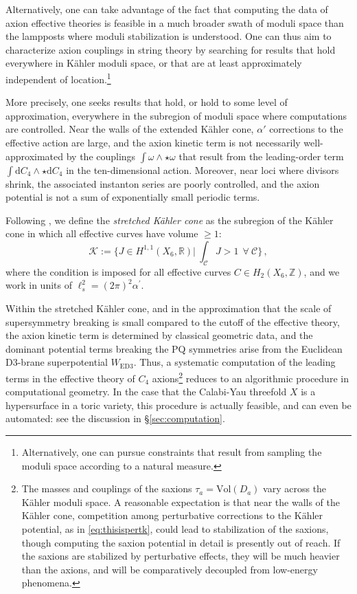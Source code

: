 \documentclass[12pt,a4wide]{article}
\def\d{\mathrm{d}}
\begin{document}
Alternatively, one can take advantage of the fact that computing the data of axion effective theories is feasible in a much broader swath of moduli space than the lampposts where moduli stabilization is understood.  
One can thus aim to characterize axion couplings in string theory by searching for results that hold everywhere in K\"ahler moduli space, or that are at least approximately independent of location.\footnote{Alternatively, one can pursue constraints that result from sampling the moduli space according to a natural measure.}


More precisely, one seeks results that hold, or hold to some level of approximation, everywhere in the subregion of moduli space where computations are controlled.  Near the walls of the extended K\"ahler cone, $\alpha'$ corrections to the effective action are large, and the axion kinetic term is not necessarily well-approximated by the couplings $\int \omega \wedge \star \omega$ that result from the leading-order term $\int \d C_4 \wedge \star \d C_4$ in the ten-dimensional action.  Moreover, near loci where divisors shrink, the associated instanton series are poorly controlled, and the axion potential is not a sum of exponentially small periodic terms.

Following \cite{Demirtas:2018akl}, we define the \emph{stretched K\"ahler cone} as the subregion of the K\"ahler cone in which all effective curves have volume $\ge 1$:
\begin{equation}\label{eq:skc}
\mathcal{K} := \biggl\{ J \in H^{1,1}(X_6,\mathbb{R}) \Bigr\vert ~\int_{\mathcal{C}} J > 1 ~~\forall~\mathcal{C}\biggr\}\,,
\end{equation}
where the condition is imposed for all effective curves $C \in H_2(X_6,\mathbb{Z})$, and we work in units of $\ell_s^2 = (2\pi)^2\alpha^\prime$.


Within the stretched K\"ahler cone, and in the approximation that the scale of supersymmetry breaking is small compared to the cutoff of the effective theory, the axion kinetic term is determined by classical geometric data, and the dominant potential terms 
breaking the PQ symmetries arise from the Euclidean D3-brane superpotential $W_{\text{ED3}}$.  Thus, a systematic computation of the leading terms in the effective theory of $C_4$ axions\footnote{The masses and couplings of the saxions $\tau_a = \text{Vol}(D_a)$ vary across the K\"ahler moduli space.  A reasonable expectation is that near the walls of the K\"ahler cone, competition among perturbative 
corrections to the K\"ahler potential, as in \eqref{eq:thisispertk}, could lead to stabilization of the saxions, though computing the saxion potential in detail is presently out of reach.  If the saxions are stabilized by perturbative effects, they will be much heavier than the axions, and will be comparatively decoupled from low-energy phenomena.} reduces to an algorithmic procedure in computational geometry.  
In the case that the Calabi-Yau threefold $X$ is a hypersurface in a toric variety, this procedure is actually feasible, and can even be automated: see the discussion in \S\ref{sec:computation}.
\end{document}
